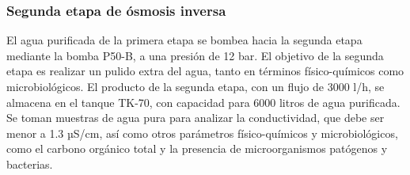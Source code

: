 \subsubsection{Segunda etapa de ósmosis inversa}

El agua purificada de la primera etapa se bombea hacia la segunda etapa mediante la bomba P50-B, a una presión de 12 bar.
El objetivo de la segunda etapa es realizar un pulido extra del agua, tanto en términos físico-químicos como microbiológicos.
El producto de la segunda etapa, con un flujo de 3000 l/h, se almacena en el tanque TK-70, con capacidad para 6000 litros de agua purificada.
Se toman muestras de agua pura para analizar la conductividad, que debe ser menor a 1.3 µS/cm, así como otros parámetros físico-químicos y microbiológicos,
como el carbono orgánico total y la presencia de microorganismos patógenos y bacterias.
